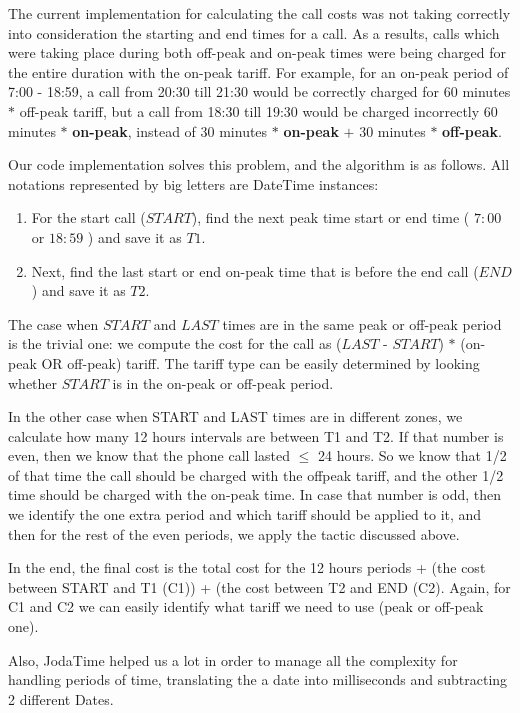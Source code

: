 \documentclass[11pt,twocolumn]{article} %
\begin{document}
The current implementation for calculating the call costs was not taking correctly into consideration 
the starting and end times for a call. As a results, calls which were taking place during both off-peak and 
on-peak times were being charged for the entire duration with the on-peak tariff. For example, for an on-peak
period of 7:00 - 18:59, a call from 20:30 till 21:30 would be correctly charged for 60 minutes $\ast$
off-peak tariff, but a call from  18:30 till 19:30 would be charged incorrectly 60 minutes $\ast$ \textbf{on-peak},
instead of 30 minutes $\ast$ \textbf{on-peak} $+$ 30 minutes $\ast$ \textbf{off-peak}.

Our code implementation solves this problem, and the algorithm is as follows. All notations represented by big letters 
are DateTime instances:
\begin{enumerate}
\item{For the start call ($START$), find the next peak time start or end time ( $7:00$ or $18:59$ ) and save it as $T1$.}

\item{Next, find the last start or end on-peak time that is before the end call ($END$) and save it as $T2$.}
\end{enumerate}

The case when $START$ and $LAST$ times are in the same peak or off-peak period is the trivial one: we compute the 
cost for the call as ($LAST$ - $START$) $\ast$ (on-peak OR off-peak) tariff. The tariff type can be easily determined by 
looking whether $START$ is in the on-peak or off-peak period.

In the other case when START and LAST times are in different zones, we calculate how many 12 hours intervals are between T1 and T2.
If that number is even, then we know that the phone call lasted $\leq$ 24 hours. So we know that 1/2 of that time the call should be 
charged with the offpeak tariff, and the other 1/2 time should be charged with the on-peak time. 
In case that number is odd, then we identify the one extra period and which tariff should be applied to it, and then for the rest of the 
even periods, we apply the tactic discussed above. 

In the end, the final cost is the total cost for the 12 hours periods + (the cost between START and T1 (C1)) + (the cost between T2 and END (C2). 
Again, for C1 and C2 we can easily identify what tariff we need to use (peak or off-peak one).

Also, JodaTime helped us a lot in order to manage all the complexity for handling periods of time,
translating the a date into milliseconds and subtracting 2 different Dates. 
\end{document}
